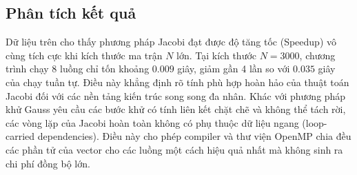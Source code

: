 \subsection{Phân tích kết quả}
Dữ liệu trên cho thấy phương pháp Jacobi đạt được độ tăng tốc (Speedup) vô cùng tích cực khi kích thước ma trận $N$ lớn. 
Tại kích thước $N=3000$, chương trình chạy $8$ luồng chỉ tốn khoảng $0.009$ giây, giảm gần 4 lần so với $0.035$ giây của chạy tuần tự.
Điều này khẳng định rõ tính phù hợp hoàn hảo của thuật toán Jacobi đối với các nền tảng kiến trúc song song đa nhân. Khác với phương pháp khử Gauss yêu cầu các bước khử có tính liên kết chặt chẽ và không thể tách rời, các vòng lặp của Jacobi hoàn toàn không có phụ thuộc dữ liệu ngang (loop-carried dependencies). Điều này cho phép compiler và thư viện OpenMP chia đều các phần tử của vector cho các luồng một cách hiệu quả nhất mà không sinh ra chi phí đồng bộ lớn.
